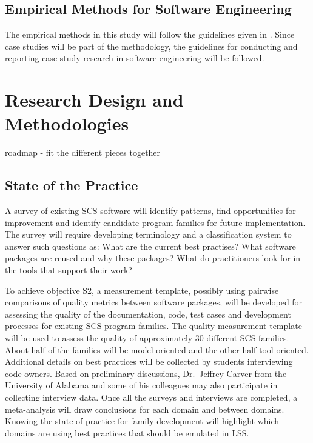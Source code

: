 \documentclass[12pt]{article}
\begin{document}
\subsection{Empirical Methods for Software Engineering} \label{SecEmpirical}

The empirical methods in this study will follow the guidelines given in
\citet{KitchenhamEtAl2002}.  Since case studies will be part of the methodology,
the guidelines for conducting and reporting case study research in software
engineering \citep{RunesonAndHost2009} will be followed.

\section{Research Design and Methodologies} \label{SecMethodologies}

roadmap - fit the different pieces together

\subsection{State of the Practice} \label{SecStateOfThePractice}

A survey of existing SCS software will identify patterns, find opportunities for
improvement and identify candidate program families for future implementation.
The survey will require developing terminology and a classification system to
answer such questions as: What are the current best practises?  What software
packages are reused and why these packages?  What do practitioners look for in
the tools that support their work?

To achieve objective S2, a measurement template, possibly using pairwise
comparisons of quality metrics between software packages, will be developed for
assessing the quality of the documentation, code, test cases and development
processes for existing SCS program families.  The quality measurement template
will be used to assess the quality of approximately 30 different SCS families.
About half of the families will be model oriented and the other half tool
oriented.  Additional details on best practices will be collected by students
interviewing code owners.  Based on preliminary discussions, Dr.\ Jeffrey Carver
from the University of Alabama and some of his colleagues may also participate
in collecting interview data. Once all the surveys and interviews are
completed, a meta-analysis will draw conclusions for each domain and between
domains.  Knowing the state of practice for family development will highlight
which domains are using best practices that should be emulated in LSS.
\end{document}
